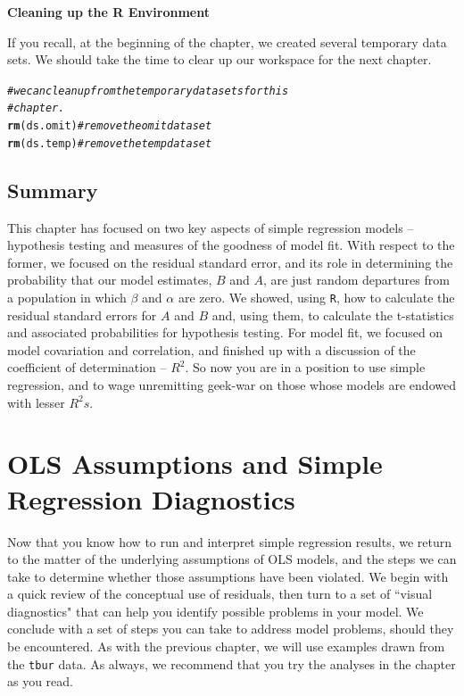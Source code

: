 \documentclass[11pt,openany]{book}\usepackage[]{graphicx}\usepackage[]{color}
\makeatletter
\newcommand{\hlcom}[1]{\textcolor[rgb]{0.678,0.584,0.686}{\textit{#1}}}%
\newcommand{\hlstd}[1]{\textcolor[rgb]{0.345,0.345,0.345}{#1}}%
\newcommand{\hlkwd}[1]{\textcolor[rgb]{0.737,0.353,0.396}{\textbf{#1}}}%
\newenvironment{kframe}{%
 \def\at@end@of@kframe{}%
 \ifinner\ifhmode%
  \def\at@end@of@kframe{\end{minipage}}%
  \begin{minipage}{\columnwidth}%
 \fi\fi%
 \def\FrameCommand##1{\hskip\@totalleftmargin \hskip-\fboxsep
 \colorbox{shadecolor}{##1}\hskip-\fboxsep
     \hskip-\linewidth \hskip-\@totalleftmargin \hskip\columnwidth}%
 \MakeFramed {\advance\hsize-\width
   \@totalleftmargin\z@ \linewidth\hsize
   \@setminipage}}%
 {\par\unskip\endMakeFramed%
 \at@end@of@kframe}
\newenvironment{knitrout}{}{} %
\renewenvironment{knitrout}{\begin{singlespace}}{\end{singlespace}}
\makeatother
\begin{document}
\noindent \textbf{Cleaning up the R Environment}

If you recall, at the beginning of the chapter, we created several temporary data sets.  We should take the time to clear up our workspace for the next chapter.
\begin{knitrout}
\color{fgcolor}\begin{kframe}
\begin{alltt}
\hlcom{# we can clean up from the temporary data sets for this}
\hlcom{# chapter.}
\hlkwd{rm}\hlstd{(ds.omit)}  \hlcom{#remove the omit data set}
\hlkwd{rm}\hlstd{(ds.temp)}  \hlcom{#remove the temp data set}
\end{alltt}
\end{kframe}
\end{knitrout}

\section{Summary} 

This chapter has focused on two key aspects of simple regression models -- hypothesis testing and  measures of the goodness of model fit. With respect to the former, we focused on the residual standard error, and its role in determining the probability that our model estimates, $B$ and $A$, are just random departures from a population in which $\beta$ and $\alpha$ are zero. We showed, using \texttt{R}, how to calculate the residual standard errors for $A$ and $B$ and, using them, to calculate the t-statistics and associated probabilities for hypothesis testing. For model fit, we focused on model covariation and correlation, and finished up with a discussion of the coefficient of determination -- $R^{2}$. So now you are in a position to use simple regression, and to wage unremitting geek-war on those whose models are endowed with lesser $R^{2}s$.




\chapter{OLS Assumptions and Simple Regression Diagnostics}

Now that you know how to run and interpret simple regression results, we return to the matter of the underlying assumptions of OLS models, and the steps we can take to determine whether those assumptions have been violated. We begin with a quick review of the conceptual use of residuals, then turn to a set of ``visual diagnostics" that can help you identify possible problems in your model. We conclude with a set of steps you can take to address model problems, should they be encountered. As with the previous chapter, we will use examples drawn from the \texttt{tbur} data.  As always, we recommend that you try the analyses in the chapter as you read.
\end{document}
